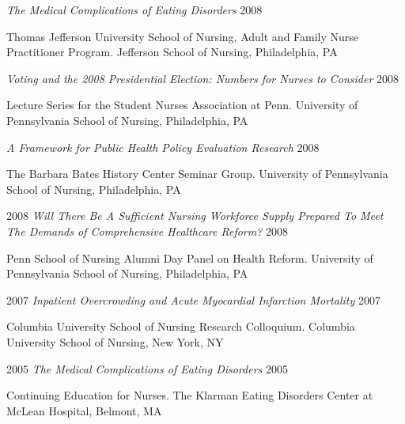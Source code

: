\documentclass[10pt,]{article}
\begin{document}
{{{{{{{{{{{{{{\begin{hangparas}{.5in}{1}
{\textit {The Medical Complications of Eating Disorders}} \hfill 2008 
\vspace{-2.5mm}
\begin{adjustwidth}{0.5cm}{1cm}
Thomas Jefferson University School of Nursing, Adult and Family Nurse Practitioner Program. Jefferson School of Nursing, Philadelphia, PA
\end{adjustwidth}

{\textit {Voting and the 2008 Presidential Election: Numbers for Nurses to Consider}} \hfill 2008 
\vspace{-2.5mm}
\begin{adjustwidth}{0.5cm}{1cm}
Lecture Series for the Student Nurses Association at Penn. University of Pennsylvania School of Nursing, Philadelphia, PA
\end{adjustwidth}

{\textit {A Framework for Public Health Policy Evaluation Research}} \hfill 2008 
\vspace{-2.5mm}
\begin{adjustwidth}{0.5cm}{1cm}
The Barbara Bates History Center Seminar Group. University of Pennsylvania School of Nursing, Philadelphia, PA
\end{adjustwidth}

2008 \hspace*{0.3cm} {\textit {Will There Be A Sufficient Nursing Workforce Supply Prepared To Meet The Demands of Comprehensive Healthcare Reform?}} \hfill 2008 
\vspace{-2.5mm}
\begin{adjustwidth}{0.5cm}{1cm}
Penn School of Nursing Alumni Day Panel on Health Reform. University of Pennsylvania School of Nursing, Philadelphia, PA
\end{adjustwidth}

2007 \hspace*{0.3cm} {\textit {Inpatient Overcrowding and Acute Myocardial Infarction Mortality}} \hfill 2007 
\vspace{-2.5mm}
\begin{adjustwidth}{0.5cm}{1cm}
Columbia University School of Nursing Research Colloquium. Columbia University School of Nursing, New York, NY
\end{adjustwidth}

2005 \hspace*{0.3cm} {\textit {The Medical Complications of Eating Disorders}} \hfill 2005 
\vspace{-2.5mm}
\begin{adjustwidth}{0.5cm}{1cm}
Continuing Education for Nurses. The Klarman Eating Disorders Center at McLean Hospital, Belmont, MA
\end{adjustwidth}


\end{hangparas}}}}}}}}}}}}}}}
\end{document}
